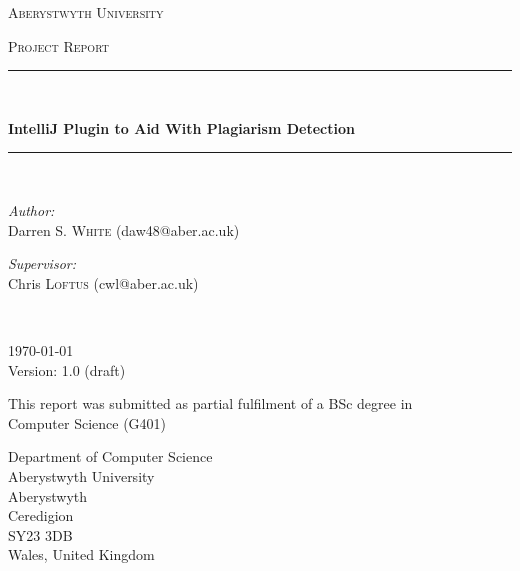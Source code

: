 \begin{titlepage}
  \begin{center}
    \vspace*{.06\textheight}
    {\scshape\LARGE Aberystwyth University\par}\vspace{1.5cm}
    \textsc{\Large Project Report}\\[0.5cm]

    \rule{.9\linewidth}{.6pt} \\[0.4cm]
    {\huge \bfseries IntelliJ Plugin to Aid With Plagiarism Detection\par}\vspace{0.4cm}
    \rule{.9\linewidth}{.6pt} \\[1.5cm]

    \begin{minipage}[t]{0.4\textwidth}
    \begin{flushleft} \large
    \emph{Author:}\\
    Darren S. \textsc{White} (daw48@aber.ac.uk)
    \end{flushleft}
    \end{minipage}
    \begin{minipage}[t]{0.4\textwidth}
    \begin{flushright} \large
    \emph{Supervisor:} \\
    Chris \textsc{Loftus} (cwl@aber.ac.uk)
    \end{flushright}
    \end{minipage}\\[1cm]

    \vfill

    \large \today\\[0.3cm]
    Version: 1.0 (draft)\\[1cm]

    \vfill

    \large This report was submitted as partial fulfilment of a BSc degree in\\[0.3cm]
    Computer Science (G401)\\[2cm]

    \vfill

    \begin{minipage}[t]{\textwidth}
    \begin{flushleft} \large
    Department of Computer Science\\
    Aberystwyth University\\
    Aberystwyth\\
    Ceredigion\\
    SY23 3DB\\
    Wales, United Kingdom\\
    \end{flushleft}
    \end{minipage}

    \vfill
  \end{center}
\end{titlepage}

